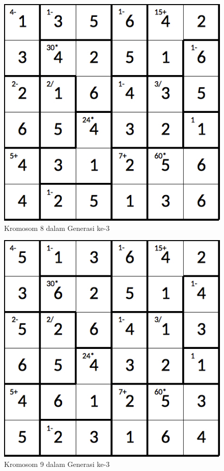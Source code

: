 \begin{figure}
\centering
\captionsetup{justification=centering}
\includegraphics[scale=0.333]{Gambar/hybridgenetic/Generation3Chromosome8}
\caption[Kromosom 8 dalam Generasi ke-3]{Kromosom 8 dalam Generasi ke-3}
\label{fig:analisisg3k8}
\end{figure}

\begin{figure}
\centering
\captionsetup{justification=centering}
\includegraphics[scale=0.333]{Gambar/hybridgenetic/Generation3Chromosome9}
\caption[Kromosom 9 dalam Generasi ke-3]{Kromosom 9 dalam Generasi ke-3}
\label{fig:analisisg3k9}
\end{figure}

